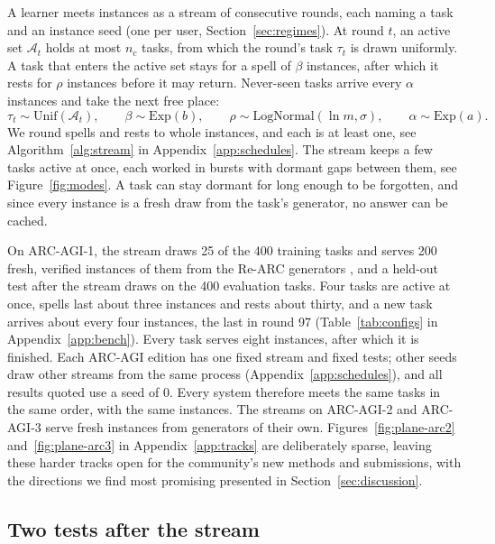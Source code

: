 A learner meets instances as a stream of consecutive rounds, each naming a task and an instance seed (one per user, Section~\ref{sec:regimes}). At round $t$, an active set $\mathcal{A}_t$ holds at most $n_c$ tasks, from which the round's task $\tau_t$ is drawn uniformly. A task that enters the active set stays for a spell of $\beta$ instances, after which it rests for $\rho$ instances before it may return. Never-seen tasks arrive every $\alpha$ instances and take the next free place:
\begin{equation}
\tau_t \sim \mathrm{Unif}(\mathcal{A}_t), \qquad \beta \sim \mathrm{Exp}(b), \qquad \rho \sim \mathrm{LogNormal}(\ln m, \sigma), \qquad \alpha \sim \mathrm{Exp}(a).
\label{eq:stream}
\end{equation}
We round spells and rests to whole instances, and each is at least one, see Algorithm~\ref{alg:stream} in Appendix~\ref{app:schedules}. The stream keeps a few tasks active at once, each worked in bursts with dormant gaps between them, see Figure~\ref{fig:modes}. A task can stay dormant for long enough to be forgotten, and since every instance is a fresh draw from the task's generator, no answer can be cached.

On ARC-AGI-1, the stream draws 25 of the 400 training tasks and serves 200 fresh, verified instances of them from the Re-ARC generators \citep{hodel2024rearc}, and a held-out test after the stream draws on the 400 evaluation tasks. Four tasks are active at once, spells last about three instances and rests about thirty, and a new task arrives about every four instances, the last in round 97 (Table~\ref{tab:configs} in Appendix~\ref{app:bench}). Every task serves eight instances, after which it is finished. Each ARC-AGI edition has one fixed stream and fixed tests; other seeds draw other streams from the same process (Appendix~\ref{app:schedules}), and all results quoted use a seed of 0. Every system therefore meets the same tasks in the same order, with the same instances. The streams on ARC-AGI-2 and ARC-AGI-3 \citep{chollet2025arcagi2,arcprize2026arcagi3} serve fresh instances from generators of their own. Figures~\ref{fig:plane-arc2} and~\ref{fig:plane-arc3} in Appendix~\ref{app:tracks} are deliberately sparse, leaving these harder tracks open for the community's new methods and submissions, with the directions we find most promising presented in Section~\ref{sec:discussion}.

\subsection{Two tests after the stream}
\label{sec:tests}

